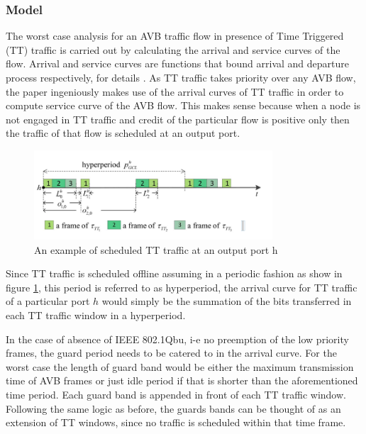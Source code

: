 \documentclass[journal,12pt,twocolumn]{IEEEtran}
\begin{document}
\subsubsection {Model}
The worst case analysis for an AVB traffic flow in presence of Time Triggered (TT) traffic is carried out by calculating the arrival and service curves of the flow. Arrival and service curves are functions that bound arrival and departure process respectively, for details \cite{NCBackground}. As TT traffic takes priority over any AVB flow, the paper ingeniously makes use of the arrival curves of TT traffic in order to compute service curve of the AVB flow. This makes sense because when a node is not engaged in TT traffic and credit of the particular flow is positive only then the traffic of that flow is scheduled at an output port.
\begin{figure}
\centering
\includegraphics[width=3.5in]{NC_TT}
\caption{An example of scheduled TT traffic at an output port h }
\label{NC_TT}
\end{figure}
Since TT traffic is scheduled offline assuming in a periodic fashion as show in figure \ref{NC_TT}, this period is referred to as hyperperiod, the arrival curve for TT traffic of a particular port $h$ would simply be the summation of the bits transferred in each TT traffic window in a hyperperiod.

In the case of absence of IEEE  802.1Qbu, i-e no preemption of the low priority frames, the guard period needs to be catered to in the arrival curve. For the worst case the length of guard band would be either the maximum transmission time of AVB frames or just idle period if that is shorter than the aforementioned time period. Each guard band is appended in front of each TT traffic window. Following the same logic as before, the guards bands can be thought of as an extension of TT windows, since no traffic is scheduled within that time frame.
\end{document}
